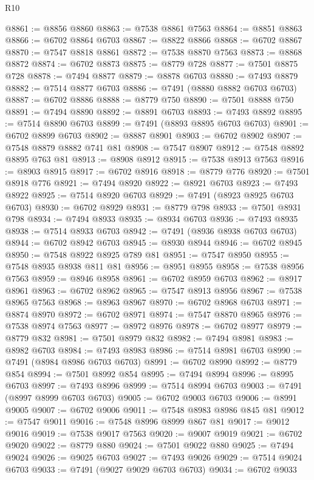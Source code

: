 \begin{lexlean}{R10}
\begin{coremodule}
@8861 := @8856 @8860
@8863 := @7538 @8861 @7563
@8864 := @8851 @8863
@8866 := @6702 @8864 @6703
@8867 := @8822 @8866
@8868 := @6702 @8867
@8870 := @7547 @8818 @8861
@8872 := @7538 @8870 @7563
@8873 := @8868 @8872
@8874 := @6702 @8873
@8875 := @8779 @728
@8877 := @7501 @8875 @728
@8878 := @7494 @8877
@8879 := @8878 @6703
@8880 := @7493 @8879
@8882 := @7514 @8877 @6703
@8886 := @7491 (@8880 @8882 @6703 @6703)
@8887 := @6702 @8886
@8888 := @8779 @750
@8890 := @7501 @8888 @750
@8891 := @7494 @8890
@8892 := @8891 @6703
@8893 := @7493 @8892
@8895 := @7514 @8890 @6703
@8899 := @7491 (@8893 @8895 @6703 @6703)
@8901 := @6702 @8899 @6703
@8902 := @8887 @8901
@8903 := @6702 @8902
@8907 := @7548 @8879 @8882 @741 @81
@8908 := @7547 @8907
@8912 := @7548 @8892 @8895 @763 @81
@8913 := @8908 @8912
@8915 := @7538 @8913 @7563
@8916 := @8903 @8915
@8917 := @6702 @8916
@8918 := @8779 @776
@8920 := @7501 @8918 @776
@8921 := @7494 @8920
@8922 := @8921 @6703
@8923 := @7493 @8922
@8925 := @7514 @8920 @6703
@8929 := @7491 (@8923 @8925 @6703 @6703)
@8930 := @6702 @8929
@8931 := @8779 @798
@8933 := @7501 @8931 @798
@8934 := @7494 @8933
@8935 := @8934 @6703
@8936 := @7493 @8935
@8938 := @7514 @8933 @6703
@8942 := @7491 (@8936 @8938 @6703 @6703)
@8944 := @6702 @8942 @6703
@8945 := @8930 @8944
@8946 := @6702 @8945
@8950 := @7548 @8922 @8925 @789 @81
@8951 := @7547 @8950
@8955 := @7548 @8935 @8938 @811 @81
@8956 := @8951 @8955
@8958 := @7538 @8956 @7563
@8959 := @8946 @8958
@8961 := @6702 @8959 @6703
@8962 := @8917 @8961
@8963 := @6702 @8962
@8965 := @7547 @8913 @8956
@8967 := @7538 @8965 @7563
@8968 := @8963 @8967
@8970 := @6702 @8968 @6703
@8971 := @8874 @8970
@8972 := @6702 @8971
@8974 := @7547 @8870 @8965
@8976 := @7538 @8974 @7563
@8977 := @8972 @8976
@8978 := @6702 @8977
@8979 := @8779 @832
@8981 := @7501 @8979 @832
@8982 := @7494 @8981
@8983 := @8982 @6703
@8984 := @7493 @8983
@8986 := @7514 @8981 @6703
@8990 := @7491 (@8984 @8986 @6703 @6703)
@8991 := @6702 @8990
@8992 := @8779 @854
@8994 := @7501 @8992 @854
@8995 := @7494 @8994
@8996 := @8995 @6703
@8997 := @7493 @8996
@8999 := @7514 @8994 @6703
@9003 := @7491 (@8997 @8999 @6703 @6703)
@9005 := @6702 @9003 @6703
@9006 := @8991 @9005
@9007 := @6702 @9006
@9011 := @7548 @8983 @8986 @845 @81
@9012 := @7547 @9011
@9016 := @7548 @8996 @8999 @867 @81
@9017 := @9012 @9016
@9019 := @7538 @9017 @7563
@9020 := @9007 @9019
@9021 := @6702 @9020
@9022 := @8779 @880
@9024 := @7501 @9022 @880
@9025 := @7494 @9024
@9026 := @9025 @6703
@9027 := @7493 @9026
@9029 := @7514 @9024 @6703
@9033 := @7491 (@9027 @9029 @6703 @6703)
@9034 := @6702 @9033

\end{coremodule}
\end{lexlean}
